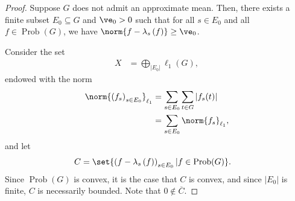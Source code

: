 \documentclass[10pt]{mypackage2}
\begin{document}
\begin{proof}
  Suppose $G$ does not admit an approximate mean. Then, there exists a finite subset $E_0\subseteq G$ and $\ve_0 > 0$ such that for all $s\in E_0$ and all $f\in \operatorname{Prob}(G)$, we have $\norm{f - \lambda_s\left(f\right)} \geq \ve_0$.\newline

  Consider the set
  \begin{align*}
    X &= \bigoplus_{\left\vert E_0 \right\vert} \ell_1\left(G\right),
  \end{align*}
  endowed with the norm
  \begin{align*}
    \norm{\left(f_s\right)_{s\in E_0}}_{\ell_1} &= \sum_{s\in E_0}\sum_{t\in G}\left\vert f_s(t) \right\vert\\
                                       &= \sum_{s\in E_0}\norm{f_s}_{\ell_1},
  \end{align*}
  and let
  \begin{align*}
    C &= \set{\left(f - \lambda_s\left(f\right)\right)_{s\in E_0} | f\in \operatorname{Prob}(G)}.
  \end{align*}
  Since $\operatorname{Prob}(G)$ is convex, it is the case that $C$ is convex, and since $\left\vert E_0 \right\vert$ is finite, $C$ is necessarily bounded. Note that $0\notin \overline{C}$.\newline


\end{proof}
\end{document}
